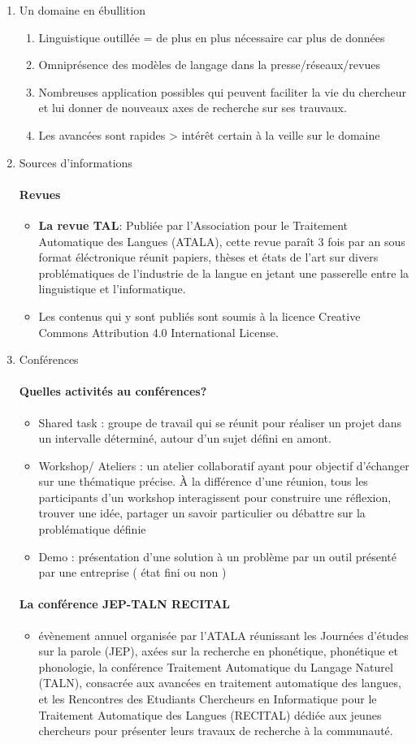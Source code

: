 \documentclass{book}
\newenvironment{titlemize}[1]{%
  \paragraph{#1}
  \begin{itemize}}
  {\end{itemize}}
\begin{document}
\begin{enumerate}
	\item Un domaine en ébullition
        \begin{enumerate}
            \item Linguistique outillée = de plus en plus nécessaire car plus de données
            \item Omniprésence des modèles de langage dans la presse/réseaux/revues
            \item Nombreuses application possibles qui peuvent faciliter la vie du chercheur et lui donner de nouveaux axes de recherche sur ses trauvaux.
            \item Les avancées sont rapides > intérêt certain à la veille sur le domaine
        \end{enumerate}
	\item Sources d'informations
        \begin{titlemize}{Revues}
            \item \textbf{La revue TAL}: Publiée par l'Association pour le Traitement Automatique des Langues (ATALA), cette revue paraît 3 fois par an sous format éléctronique réunit papiers, thèses et états de l'art sur divers problématiques de l'industrie de la langue en jetant une passerelle entre la linguistique et l'informatique. 
            \item Les contenus qui y sont publiés sont soumis à la licence Creative Commons Attribution 4.0 International License.
        \end{titlemize}
    \item Conférences
            \begin{titlemize}{Quelles activités au conférences?}
                \item Shared task : groupe de travail qui se réunit pour réaliser un projet dans un intervalle déterminé, autour d'un sujet défini en amont.
                
                \item Workshop/ Ateliers : un atelier collaboratif ayant pour objectif d’échanger sur une thématique précise. À la différence d’une réunion, tous les participants d’un workshop interagissent pour construire une réflexion, trouver une idée, partager un savoir particulier ou débattre sur la problématique définie 
                \item Demo : présentation d'une solution à un problème par un outil présenté par une entreprise ( état fini ou non )
            \end{titlemize}
            \begin{titlemize}{La conférence JEP-TALN RECITAL}
                \item évènement annuel organisée par l'ATALA réunissant les Journées d'études sur la parole (JEP), axées sur la recherche en phonétique, phonétique et phonologie, la conférence Traitement Automatique du Langage Naturel (TALN), consacrée aux avancées en traitement automatique des langues, et les Rencontres des Etudiants Chercheurs en Informatique pour le Traitement Automatique des Langues (RECITAL) dédiée aux jeunes chercheurs pour présenter leurs travaux de recherche à la communauté.
                

\end{titlemize}
\end{enumerate}
\end{document}
